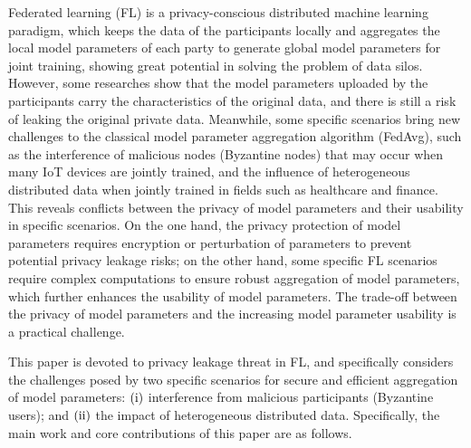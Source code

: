 \begin{eabstract}

Federated learning (FL) is a privacy-conscious distributed machine learning paradigm, which keeps the data of the participants locally and aggregates the local model parameters of each party to generate global model parameters for joint training, showing great potential in solving the problem of data silos. However, some researches show that the model parameters uploaded by the participants carry the characteristics of the original data, and there is still a risk of leaking the original private data. Meanwhile, some specific scenarios bring new challenges to the classical model parameter aggregation algorithm (FedAvg), such as the interference of malicious nodes (Byzantine nodes) that may occur when many IoT devices are jointly trained, and the influence of heterogeneous distributed data when jointly trained in fields such as healthcare and finance.
This reveals conflicts between the privacy of model parameters and their usability in specific scenarios. On the one hand, the privacy protection of model parameters requires encryption or perturbation of parameters to prevent potential privacy leakage risks; on the other hand, some specific FL scenarios require complex computations to ensure robust aggregation of model parameters, which further enhances the usability of model parameters. The trade-off between the privacy of model parameters and the increasing model parameter usability is a practical challenge.

This paper is devoted to privacy leakage threat in FL, and specifically considers the challenges posed by two specific scenarios for secure and efficient aggregation of model parameters: $(\rm \romannumeral1)$ interference from malicious participants (Byzantine users); and $(\rm \romannumeral2)$ the impact of heterogeneous distributed data. Specifically, the main work and core contributions of this paper are as follows.


\end{eabstract}
